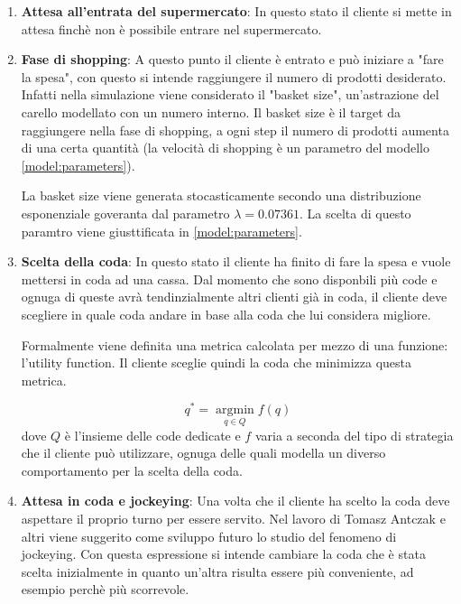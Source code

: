 \begin{enumerate}
	\item \textbf{Attesa all'entrata del supermercato}: In questo stato il cliente si mette in attesa finchè non è possibile entrare nel supermercato. 
	\item \textbf{Fase di shopping}: A questo punto il cliente è entrato e può iniziare a "fare la spesa", con questo si intende raggiungere il numero di prodotti desiderato. Infatti nella simulazione viene considerato il "basket size", un'astrazione del carello modellato con un numero interno. Il basket size è il target da raggiungere nella fase di shopping, a ogni step il numero di prodotti aumenta di una certa quantità (la velocità di shopping è un parametro del modello \autoref{model:parameters}). 
	
	La basket size viene generata stocasticamente secondo una distribuzione esponenziale goveranta dal parametro $\lambda = 0.07361$. La scelta di questo paramtro viene giusttificata in \autoref{model:parameters}. 
	
	\item \textbf{Scelta della coda}: In questo stato il cliente ha finito di fare la spesa e vuole mettersi in coda ad una cassa. Dal momento che sono disponbili più code e ognuga di queste avrà tendinzialmente altri clienti già in coda, il cliente deve scegliere in quale coda andare in base alla coda che lui considera migliore.
	
	Formalmente viene definita una metrica calcolata per mezzo di una funzione: l'utility function. Il cliente sceglie quindi la coda che minimizza questa metrica.

	\begin{equation}
		q^* = \operatorname*{argmin}_{q \in Q} f(q) \label{eq:strategy}
	\end{equation}
	dove $Q$ è l'insieme delle code dedicate e $f$ varia a seconda del tipo di strategia che il cliente può utilizzare, ognuga delle quali modella un diverso comportamento per la scelta della coda.

	\item \textbf{Attesa in coda e jockeying}:  Una volta che il cliente ha scelto la coda deve aspettare il proprio turno per essere servito. Nel lavoro di Tomasz Antczak e altri \cite{article1} viene suggerito come sviluppo futuro lo studio del fenomeno di jockeying. Con questa espressione si intende cambiare la coda che è stata scelta inizialmente in quanto un'altra risulta essere più conveniente, ad esempio perchè più scorrevole.
	

\end{enumerate}
